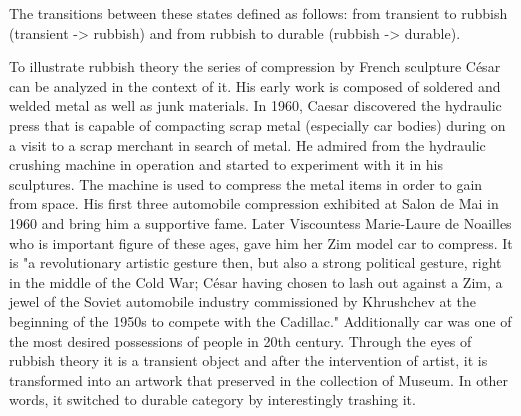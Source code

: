 
The transitions between these states defined as follows: from transient to rubbish (transient -> rubbish) and from rubbish to durable (rubbish -> durable). 

To illustrate rubbish theory the series of compression by French sculpture César can be analyzed in the context of it. His early work is composed of soldered and welded metal as well as junk materials. In 1960, Caesar discovered the hydraulic press that is capable of compacting scrap metal (especially car bodies) during on a visit to a scrap merchant in search of metal. He admired from the hydraulic crushing machine in operation and started to experiment with it in his sculptures. The machine is used to compress the metal items in order to gain from space. His first three automobile compression exhibited at Salon de Mai in 1960 and bring him a supportive fame. Later Viscountess Marie-Laure de Noailles who is important figure of these ages, gave him her Zim model car to compress. It is 
"a revolutionary artistic gesture then, but also a strong political gesture, right in the middle of the Cold War; César having chosen to lash out against a Zim, a jewel of the Soviet automobile industry commissioned by Khrushchev at the beginning of the 1950s to compete with the Cadillac." Additionally car was one of the most desired possessions of people in 20th century. Through the eyes of rubbish theory it is a transient object and after the intervention of artist, it is transformed into an artwork that preserved in the collection of Museum. In other words, it switched to durable category by interestingly trashing it. 



